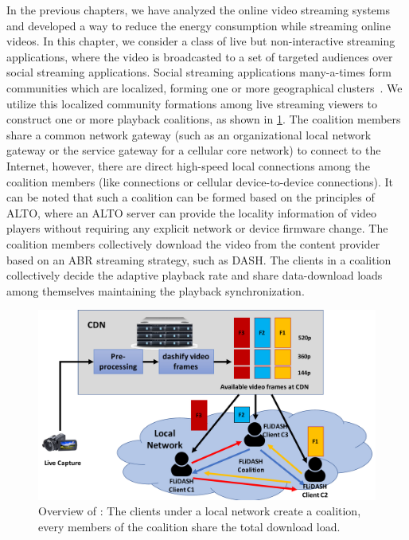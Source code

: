 In the previous chapters, we have analyzed the online video streaming systems and developed a way to reduce the energy consumption while streaming online videos. In this chapter, we consider a class of live but non-interactive streaming applications, where the video is broadcasted to a set of targeted audiences over social streaming applications. Social streaming applications many-a-times form communities which are localized, forming one or more geographical clusters~\cite{wang2016anatomy}. We utilize this localized community formations among live streaming viewers to construct one or more playback coalitions, as shown in \fig\ref{fig:chap06:flsd}. The coalition members share a common network gateway (such as an organizational local network gateway or the service gateway for a cellular core network) to connect to the Internet, however, there are direct high-speed local connections among the coalition members (like  connections or cellular device-to-device connections). It can be noted that such a coalition can be formed based on the principles of \ac{ALTO}, where an \ac{ALTO} server can provide the locality information of video players without requiring any explicit network or device firmware change. The coalition members collectively download the video from the content provider based on an \ac{ABR} streaming strategy, such as \ac{DASH}. The clients in a coalition collectively decide the adaptive playback rate and share data-download loads among themselves maintaining the playback synchronization. 
\begin{figure}[!ht]
    \centering
    \includegraphics[width=0.8\linewidth]{img/flsd.pdf}
    \caption{Overview of \our: The clients under a local network create a coalition, every members of the coalition share the total download load.}
    \label{fig:chap06:flsd}
\end{figure}

